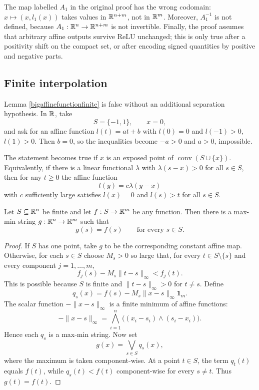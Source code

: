 \begin{remark}
The map labelled $A_1$ in the original proof has the wrong codomain: $x\mapsto (x,l_1(x))$ takes values in $\mathbb{R}^{n+m}$, not in $\mathbb{R}^m$.  Moreover, $A_1^{-1}$ is not defined, because $A_1:\mathbb{R}^n\to\mathbb{R}^{n+m}$ is not invertible.  Finally, the proof assumes that arbitrary affine outputs survive ReLU unchanged; this is only true after a positivity shift on the compact set, or after encoding signed quantities by positive and negative parts.
\end{remark}

\subsection{Finite interpolation}

\begin{remark}
Lemma \ref{bigaffinefunctionfinite} is false without an additional separation hypothesis.  In $\mathbb{R}$, take
\[
S=\{-1,1\},
\qquad
x=0,
\]
and ask for an affine function $l(t)=at+b$ with $l(0)=0$ and $l(-1)>0$, $l(1)>0$.  Then $b=0$, so the inequalities become $-a>0$ and $a>0$, impossible.

The statement becomes true if $x$ is an exposed point of $\operatorname{conv}(S\cup\{x\})$.  Equivalently, if there is a linear functional $\lambda$ with $\lambda(s-x)>0$ for all $s\in S$, then for any $t\geq0$ the affine function
\[
l(y)=c\lambda(y-x)
\]
with $c$ sufficiently large satisfies $l(x)=0$ and $l(s)>t$ for all $s\in S$.
\end{remark}

\begin{lemma}
\label{ai:finite_interpolation}
Let $S\subseteq\mathbb{R}^n$ be finite and let $f:S\to\mathbb{R}^m$ be any function.  Then there is a max-min string $g:\mathbb{R}^n\to\mathbb{R}^m$ such that
\[
g(s)=f(s)\qquad\text{for every }s\in S.
\]
\end{lemma}

\begin{proof}
If $S$ has one point, take $g$ to be the corresponding constant affine map.  Otherwise, for each $s\in S$ choose $M_s>0$ so large that, for every $t\in S\setminus\{s\}$ and every component $j=1,\ldots,m$,
\[
f_j(s)-M_s\lVert t-s\rVert_\infty < f_j(t).
\]
This is possible because $S$ is finite and $\lVert t-s\rVert_\infty>0$ for $t\neq s$.  Define
\[
q_s(x)=f(s)-M_s\lVert x-s\rVert_\infty\mathbf 1_m.
\]
The scalar function $-\lVert x-s\rVert_\infty$ is a finite minimum of affine functions:
\[
-\lVert x-s\rVert_\infty
=\bigwedge_{i=1}^n\big((x_i-s_i)\wedge(s_i-x_i)\big).
\]
Hence each $q_s$ is a max-min string.  Now set
\[
g(x)=\bigvee_{s\in S}q_s(x),
\]
where the maximum is taken component-wise.  At a point $t\in S$, the term $q_t(t)$ equals $f(t)$, while $q_s(t)<f(t)$ component-wise for every $s\neq t$.  Thus $g(t)=f(t)$.
\end{proof}

